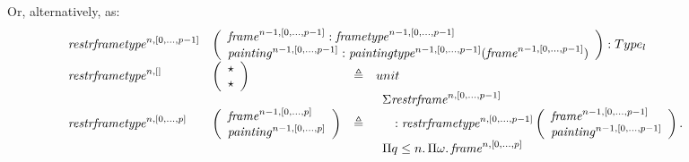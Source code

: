 \documentclass{article}
\newcommand{\defeq}{\triangleq}
\newcommand{\myframe}{\mathit{frame}}
\newcommand{\myframetype}{\mathit{frametype}}
\newcommand{\painting}{\mathit{painting}}
\newcommand{\paintingtype}{\mathit{paintingtype}}
\newcommand{\restrframe}{\mathit{restrframe}}
\newcommand{\restrframetype}{\mathit{restrframetype}}
\begin{document}
\begin{enumerate}
        Or, alternatively, as:
        $$\!\!\!\!\!\!\!\!\!\!\!\!
          \begin{array}{llcl}
            \restrframetype^{n,[0,...,p-1]}                            &
            \multicolumn{3}{l}{
              \left(\begin{array}{l}
                        \myframe^{n-1,[0,...,p-1]}:\myframetype^{n-1,[0,...,p-1]}                               \\
                        \painting^{n-1,[0,...,p-1]}:\paintingtype^{n-1,[0,...,p-1]}(\myframe^{n-1,[0,...,p-1]}) \\
                      \end{array}\right) : Type_{l}
            }                                                                                         \\
            \restrframetype^{n,[]}                                     &
            \left(\begin{array}{l}
                      \star \\
                      \star \\
                    \end{array}\right)                                     & \defeq &
            unit                                                                                      \\
            \restrframetype^{n,[0,...,p]}                              &
            \left(\begin{array}{l}
                      \myframe^{n-1,[0,...,p]}  \\
                      \painting^{n-1,[0,...,p]} \\
                    \end{array}\right) & \defeq &
            \begin{array}{l}
              \Sigma \restrframe^{n,[0,...,p-1]}                            \\
              \quad:\restrframetype^{n,[0,...,p-1]}
              \left(\begin{array}{l}
                        \myframe^{n-1,[0,...,p-1]}  \\
                        \painting^{n-1,[0,...,p-1]} \\
                      \end{array}\right)
              .\,                                                           \\
              \Pi q\leq n.\,\Pi \omega.\,\myframe^{n,[0,...,p]}

\end{array}
\end{array}$$
\end{enumerate}
\end{document}
